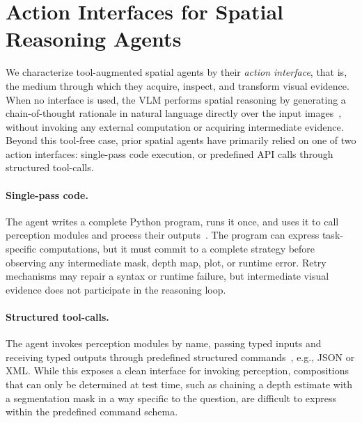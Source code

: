 \section{Action Interfaces for Spatial Reasoning Agents}
\label{sec:interfaces}
\label{sec:code}

We characterize tool-augmented spatial agents by their \emph{action interface}, that is, the medium through which they acquire, inspect, and transform visual evidence.
When no interface is used, the VLM performs spatial reasoning by generating a chain-of-thought rationale in natural language directly over the input images~\citep{yang2024think,chen2025eagle2.5,qwen3.5,gemma4}, without invoking any external computation or acquiring intermediate evidence.
Beyond this tool-free case, prior spatial agents have primarily relied on one of two action interfaces: single-pass code execution, or predefined API calls through structured tool-calls.

\paragraph{Single-pass code.}
The agent writes a complete Python program, runs it once, and uses it to call perception modules and process their outputs~\citep{luo2026pyspatial,marsili2025visual}.
The program can express task-specific computations, but it must commit to a complete strategy before observing any intermediate mask, depth map, plot, or runtime error.
Retry mechanisms may repair a syntax or runtime failure, but intermediate visual evidence does not participate in the reasoning loop.

\paragraph{Structured tool-calls.}
The agent invokes perception modules by name, passing typed inputs and receiving typed outputs through predefined structured commands~\citep{chen2025geometrically,chen2025spacetools,ropero2026riemind}, e.g., JSON or XML.
While this exposes a clean interface for invoking perception, compositions that can only be determined at test time, such as chaining a depth estimate with a segmentation mask in a way specific to the question, are difficult to express within the predefined command schema.

